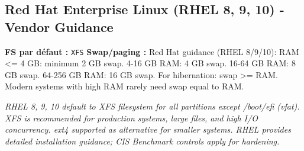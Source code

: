 \documentclass[10pt,a4paper]{article}
\begin{document}
\subsection{Red Hat Enterprise Linux (RHEL 8, 9, 10) - Vendor Guidance}
\noindent\small \textbf{FS par d\'efaut :} \texttt{XFS} \quad\textbullet\quad \textbf{Swap/paging :} Red Hat guidance (RHEL 8/9/10): RAM <= 4 GB: minimum 2 GB swap. 4-16 GB RAM: 4 GB swap. 16-64 GB RAM: 8 GB swap. 64-256 GB RAM: 16 GB swap. For hibernation: swap >= RAM. Modern systems with high RAM rarely need swap equal to RAM.\normalsize\par\smallskip
\noindent\small\textit{RHEL 8, 9, 10 default to XFS filesystem for all partitions except /boot/efi (vfat). XFS is recommended for production systems, large files, and high I/O concurrency. ext4 supported as alternative for smaller systems. RHEL provides detailed installation guidance; CIS Benchmark controls apply for hardening.}\normalsize\par\smallskip
\end{document}
